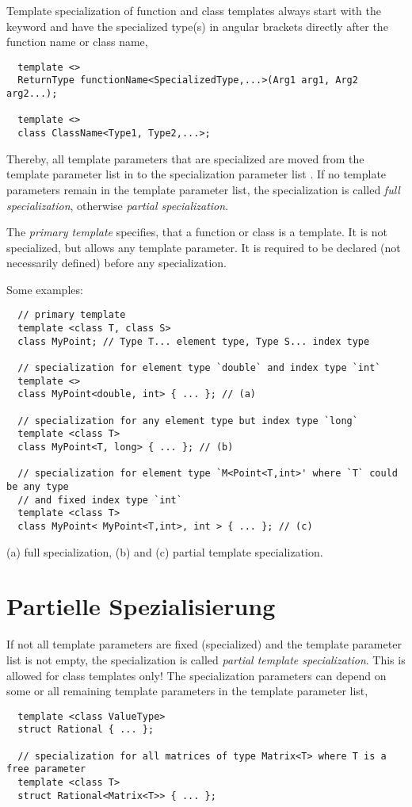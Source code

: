 Template specialization of function and class templates always start with the keyword  and have the specialized type(s) in angular brackets
directly after the function name or class name, \eg
%
\begin{verbatim}
  template <>
  ReturnType functionName<SpecializedType,...>(Arg1 arg1, Arg2 arg2...);

  template <>
  class ClassName<Type1, Type2,...>;
\end{verbatim}
%
Thereby, all template parameters that are specialized are moved from the template parameter list in  to the specialization parameter list
. If no template parameters remain in the template parameter list, the specialization is called \emph{full specialization},
otherwise \emph{partial specialization}.

The \emph{primary template} specifies, that a function or class is a template. It is not specialized, but allows any template parameter. It is required to be
declared (not necessarily defined) before any specialization.

Some examples:
\begin{verbatim}
  // primary template
  template <class T, class S>
  class MyPoint; // Type T... element type, Type S... index type

  // specialization for element type `double` and index type `int`
  template <>
  class MyPoint<double, int> { ... }; // (a)

  // specialization for any element type but index type `long`
  template <class T>
  class MyPoint<T, long> { ... }; // (b)

  // specialization for element type `M<Point<T,int>' where `T` could be any type
  // and fixed index type `int`
  template <class T>
  class MyPoint< MyPoint<T,int>, int > { ... }; // (c)
\end{verbatim}
(a) full specialization, (b) and (c) partial template specialization.


\section{Partielle Spezialisierung}\label{seq:partial_template_specialization}
If not all template parameters are fixed (specialized) and the template parameter list is not empty, the specialization is called
\emph{partial template specialization}. This is allowed for class templates only! The specialization parameters can depend on some or all remaining
template parameters in the template parameter list, \eg
%
\begin{verbatim}
  template <class ValueType>
  struct Rational { ... };

  // specialization for all matrices of type Matrix<T> where T is a free parameter
  template <class T>
  struct Rational<Matrix<T>> { ... };
\end{verbatim}

